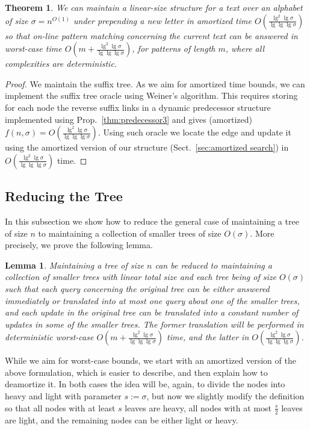 \documentclass[11pt,onecolumn,final]{article} \usepackage{a4}
\theoremstyle{plain}
\newtheorem{lemma}[definition]{Lemma}
\newtheorem{theorem}[definition]{Theorem}
\theoremstyle{remark}
\begin{document}
\begin{theorem}
We can maintain a linear-size structure for a text over an alphabet of size $\sigma=n^{O(1)}$ under prepending a new letter in amortized time $O(\frac{\lg^{2}\lg\sigma}{\lg\lg\lg\sigma})$ so that on-line pattern matching concerning the current text can be answered in worst-case time $O(m+\frac{\lg^{2}\lg\sigma}{\lg\lg\lg\sigma})$, for patterns of length $m$, where all complexities are deterministic.
\end{theorem}

\begin{proof}
We maintain the suffix tree. As we aim for amortized time bounds, we can implement the suffix tree oracle using Weiner's algorithm. This requires storing for each node the reverse suffix links in a dynamic predecessor structure implemented using Prop.~\ref{thm:predecessor3} and gives (amortized) $f(n,\sigma)=O(\frac{\lg^{2}\lg\sigma}{\lg\lg\lg\sigma})$. Using such oracle we locate the edge and update it using the amortized version of our structure (Sect.~\ref{sec:amortized search}) in $O(\frac{\lg^2\lg\sigma}{\lg\lg\lg\sigma})$ time.
\end{proof}

\subsection{Reducing the Tree}

In this subsection we show how to reduce the general case of maintaining a tree of size $n$ to maintaining a collection of smaller trees of size $O(\sigma)$. More precisely, we prove the following lemma.

\begin{lemma}
\label{thm:reduction}
Maintaining a tree of size $n$ can be reduced to maintaining a collection of smaller trees with linear total size and each tree being of size $O(\sigma)$ such that each query concerning the original tree can be either answered immediately or translated into at most one query about one of the smaller trees, and each update in the original tree can be translated into a constant number of updates in some of the smaller trees. The former translation will be performed in deterministic worst-case $O(m+\frac{\lg^{2}\lg \sigma}{\lg\lg\lg \sigma})$ time, and the latter in $O(\frac{\lg^{2}\lg \sigma}{\lg\lg\lg \sigma})$.
\end{lemma}

While we aim for worst-case bounds, we start with an amortized version of the above formulation, which is easier to describe, and then explain how to deamortize it. In both cases the idea will be, again, to divide the nodes into heavy and light with parameter $s:=\sigma$, but now we slightly modify the definition so that all nodes with at least $s$ leaves are heavy, all nodes with at most $\frac{s}{2}$ leaves are light, and the remaining nodes can be either light or heavy.
\end{document}
